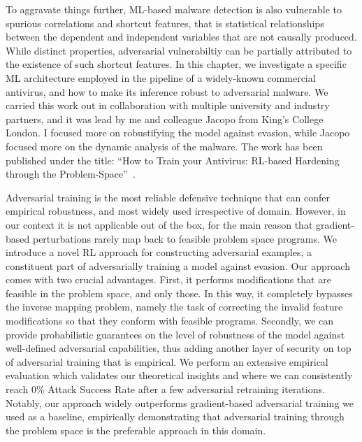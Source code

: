 To aggravate things further, ML-based malware detection is also vulnerable to spurious correlations and shortcut features, that is statistical relationships between the dependent and independent variables that are not causally produced.
While distinct properties, adversarial vulnerabiltiy can be partially attributed to the existence of such shortcut features.
In this chapter, we investigate a specific ML architecture employed in the pipeline of a widely-known commercial antivirus, and how to make its inference robust to adversarial malware.
We carried this work out in collaboration with multiple university and industry partners, and it was lead by me and colleague Jacopo from King's College London.
I focused more on robustifying the model against evasion, while Jacopo focused more on the dynamic analysis of the malware.
The work has been published under the title: ``How to Train your Antivirus: RL-based Hardening through the Problem-Space''~\cite{tisngenopoulos2024train}.

Adversarial training is the most reliable defensive technique that can confer empirical robustness, and most widely used irrespective of domain. 
However, in our context it is not applicable out of the box, for the main reason that gradient-based perturbations rarely map back to feasible problem space programs. 
We introduce a novel \gls{RL} approach for constructing adversarial examples, a constituent part of adversarially training a model against evasion.
Our approach comes with two crucial advantages.
First, it performs modifications that are feasible in the problem space, and only those.
In this way, it completely bypasses the inverse mapping problem, namely the task of correcting the invalid feature modifications so that they conform with feasible programs.
Secondly, we can provide probabilistic guarantees on the level of robustness of the model against well-defined adversarial capabilities, thus adding another layer of security on top of adversarial training that is empirical.
We perform an extensive empirical evaluation which validates our theoretical insights and where we can consistently reach 0\% Attack Success Rate after a few adversarial retraining iterations.
Notably, our approach widely outperforms gradient-based adversarial training we used as a baseline, empirically demonstrating that adversarial training through the problem space is the preferable approach in this domain.


